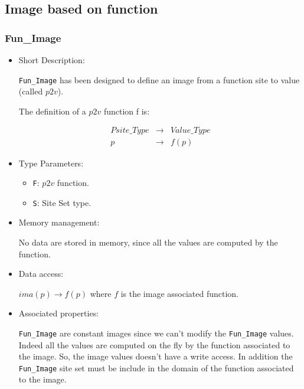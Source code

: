 
\subsection{Image based on function}

\subsubsection{Fun\_Image}

\begin{itemize}

\item{Short Description:}

\verb+Fun_Image+ has been designed to define an image from a function site to
value (called $p2v$).

The definition of a $p2v$ function f is:

\begin{eqnarray*}
Psite\_Type & \rightarrow & Value\_Type \\
      p     &     \rightarrow & f(p)
\end{eqnarray*}



\item{Type Parameters:}

\begin{itemize}
\item \verb+F+: $p2v$ function.
\item \verb+S+: Site Set type.
\end{itemize}

\item{Memory management:}

No data are stored in memory, since all the values are computed by the
function.

\item{Data access:}

$ima(p) \rightarrow f(p)$ where $f$ is the image associated function.

\item{Associated properties:}

\verb+Fun_Image+ are constant images since we can't modify the
\verb+Fun_Image+ values.
Indeed all the values are computed on the fly by the function associated to the
image.
So, the image values doesn't have a write access.
In addition the \verb+Fun_Image+ site set must be include in the domain of
the function associated to the image.

\end{itemize}

